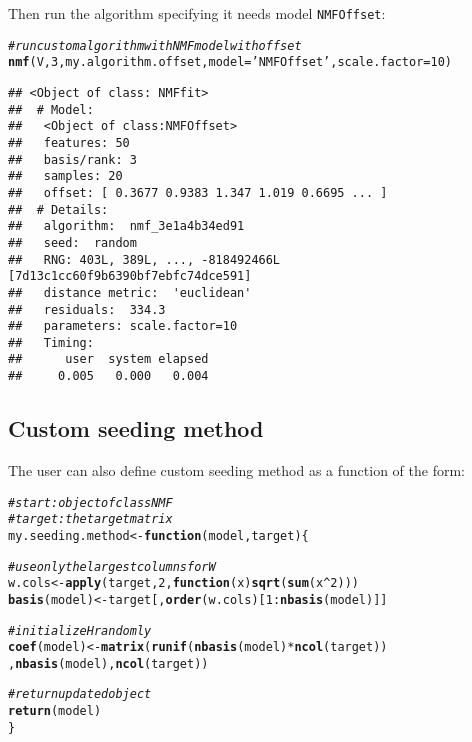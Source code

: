 \documentclass[a4paper]{article}\usepackage[]{graphicx}\usepackage[]{color}
\makeatletter
\newcommand{\hlnum}[1]{\textcolor[rgb]{0.686,0.059,0.569}{#1}}%
\newcommand{\hlstr}[1]{\textcolor[rgb]{0.192,0.494,0.8}{#1}}%
\newcommand{\hlcom}[1]{\textcolor[rgb]{0.678,0.584,0.686}{\textit{#1}}}%
\newcommand{\hlopt}[1]{\textcolor[rgb]{0,0,0}{#1}}%
\newcommand{\hlstd}[1]{\textcolor[rgb]{0.345,0.345,0.345}{#1}}%
\newcommand{\hlkwa}[1]{\textcolor[rgb]{0.161,0.373,0.58}{\textbf{#1}}}%
\newcommand{\hlkwb}[1]{\textcolor[rgb]{0.69,0.353,0.396}{#1}}%
\newcommand{\hlkwc}[1]{\textcolor[rgb]{0.333,0.667,0.333}{#1}}%
\newcommand{\hlkwd}[1]{\textcolor[rgb]{0.737,0.353,0.396}{\textbf{#1}}}%
\newenvironment{kframe}{%
 \def\at@end@of@kframe{}%
 \ifinner\ifhmode%
  \def\at@end@of@kframe{\end{minipage}}%
  \begin{minipage}{\columnwidth}%
 \fi\fi%
 \def\FrameCommand##1{\hskip\@totalleftmargin \hskip-\fboxsep
 \colorbox{shadecolor}{##1}\hskip-\fboxsep
     \hskip-\linewidth \hskip-\@totalleftmargin \hskip\columnwidth}%
 \MakeFramed {\advance\hsize-\width
   \@totalleftmargin\z@ \linewidth\hsize
   \@setminipage}}%
 {\par\unskip\endMakeFramed%
 \at@end@of@kframe}
\newenvironment{knitrout}{}{} %
\let\code=\texttt
\makeatother
\begin{document}
Then run the algorithm specifying it needs model \code{NMFOffset}:
\begin{knitrout}
\color{fgcolor}\begin{kframe}
\begin{alltt}
\hlcom{# run custom algorithm with NMF model with offset}
\hlkwd{nmf}\hlstd{(V,} \hlnum{3}\hlstd{, my.algorithm.offset,} \hlkwc{model}\hlstd{=}\hlstr{'NMFOffset'}\hlstd{,} \hlkwc{scale.factor}\hlstd{=}\hlnum{10}\hlstd{)}
\end{alltt}
\begin{verbatim}
## <Object of class: NMFfit>
##  # Model:
##   <Object of class:NMFOffset>
##   features: 50 
##   basis/rank: 3 
##   samples: 20 
##   offset: [ 0.3677 0.9383 1.347 1.019 0.6695 ... ]
##  # Details:
##   algorithm:  nmf_3e1a4b34ed91 
##   seed:  random 
##   RNG: 403L, 389L, ..., -818492466L [7d13c1cc60f9b6390bf7ebfc74dce591]
##   distance metric:  'euclidean' 
##   residuals:  334.3 
##   parameters: scale.factor=10 
##   Timing:
##      user  system elapsed 
##     0.005   0.000   0.004
\end{verbatim}
\end{kframe}
\end{knitrout}


\subsection{Custom seeding method}\label{sec:seed_custom}

The user can also define custom seeding method as a function of the form:


\begin{knitrout}
\color{fgcolor}\begin{kframe}
\begin{alltt}
\hlcom{# start: object of class NMF}
\hlcom{# target: the target matrix}
\hlstd{my.seeding.method} \hlkwb{<-} \hlkwa{function}\hlstd{(}\hlkwc{model}\hlstd{,} \hlkwc{target}\hlstd{)\{}

        \hlcom{# use only the largest columns for W}
        \hlstd{w.cols} \hlkwb{<-} \hlkwd{apply}\hlstd{(target,} \hlnum{2}\hlstd{,} \hlkwa{function}\hlstd{(}\hlkwc{x}\hlstd{)} \hlkwd{sqrt}\hlstd{(}\hlkwd{sum}\hlstd{(x}\hlopt{^}\hlnum{2}\hlstd{)))}
        \hlkwd{basis}\hlstd{(model)} \hlkwb{<-} \hlstd{target[,}\hlkwd{order}\hlstd{(w.cols)[}\hlnum{1}\hlopt{:}\hlkwd{nbasis}\hlstd{(model)]]}

        \hlcom{# initialize H randomly}
        \hlkwd{coef}\hlstd{(model)} \hlkwb{<-} \hlkwd{matrix}\hlstd{(}\hlkwd{runif}\hlstd{(}\hlkwd{nbasis}\hlstd{(model)}\hlopt{*}\hlkwd{ncol}\hlstd{(target))}
                                                \hlstd{,} \hlkwd{nbasis}\hlstd{(model),} \hlkwd{ncol}\hlstd{(target))}

        \hlcom{# return updated object}
        \hlkwd{return}\hlstd{(model)}
\hlstd{\}}
\end{alltt}
\end{kframe}
\end{knitrout}
\end{document}
